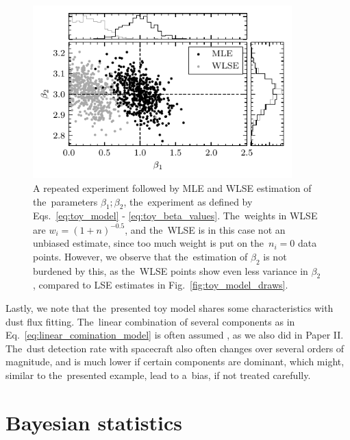 \begin{figure}[ht]
 	\centering
 	\includegraphics[width=10cm]{figures/toy_model_draws_weighted.pdf}
 	\caption{A repeated experiment followed by MLE and WLSE estimation of the~parameters $\beta_1; \beta_2$, the~experiment as defined by Eqs.~\ref{eq:toy_model} - \ref{eq:toy_beta_values}. The~weights in WLSE are $w_i = (1+n)^{-0.5}$, and the~WLSE is in this case not an unbiased estimate, since too much weight is put on the~$n_i=0$ data points. However, we observe that the~estimation of $\beta_2$ is not burdened by this, as the~WLSE points show even less variance in $\beta_2$, compared to LSE estimates in Fig.~\ref{fig:toy_model_draws}.}
 	\label{fig:toy_model_draws_weighted}
\end{figure}

Lastly, we note that the~presented toy model shares some characteristics with dust flux fitting. The~linear combination of several components as in Eq.~\ref{eq:linear_comination_model} is often assumed \citep{szalay2021collisional,zaslavsky2012interplanetary}, as we also did in Paper II. The~dust detection rate with spacecraft also often changes over several orders of magnitude, and is much lower if certain components are dominant, which might, similar to the~presented example, lead to a~bias, if not treated carefully. 

\section{Bayesian statistics}

